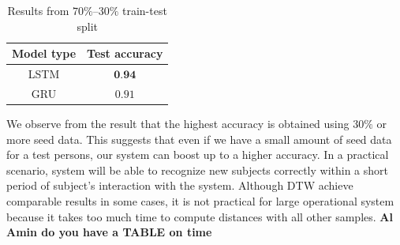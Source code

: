 \documentclass[10pt,twocolumn,letterpaper]{article}
\begin{document}
\begin{table}[h]
	\begin{center}
		\begin{tabular}{|c|c|}
			\hline
			Model type & Test accuracy\\
			\hline\hline
			LSTM & $\textbf{0.94}$\\
			\hline
			GRU & $0.91$\\
			\hline
		\end{tabular}
	\end{center}
	\caption{Results from $70\%$--$30\%$ train-test split}
	\label{table:result_conv}
\end{table}
%		
We observe from the result that the highest accuracy is obtained using $30\%$ or more seed data. This suggests that even if we have a small amount of seed data for a test persons, our system can boost up to a higher accuracy. In a practical scenario, system will be able to recognize new subjects correctly within a short period of subject's interaction with the system. Although DTW achieve comparable results in some cases, it is not practical for large operational system because it takes too much time to compute distances with all other samples.
{\bf Al Amin do you have a TABLE on time}
\end{document}

